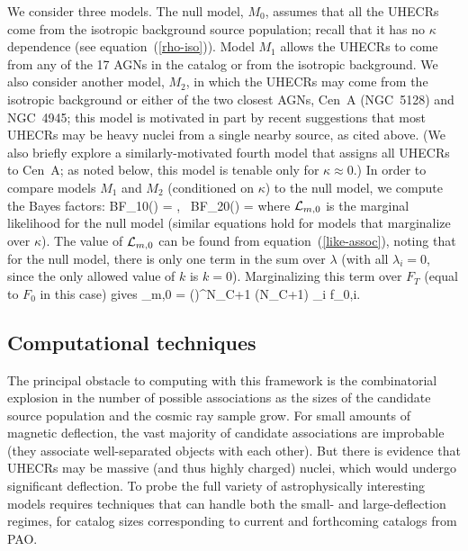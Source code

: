 We consider three models.  The null model, $M_0$, assumes that all the
UHECRs come from the isotropic background source population; recall that it
has no $\kappa$ dependence (see equation~(\ref{rho-iso})).  Model $M_1$
allows the UHECRs to come from any of the 17 AGNs in the catalog or from the
isotropic background.  We also consider another model, $M_2$, in which the
UHECRs may come from the isotropic background or either of the two closest
AGNs, Cen~A (NGC~5128) and NGC~4945; this model is motivated in part by
recent suggestions that most UHECRs may be heavy nuclei from a single nearby
source, as cited above.  
(We also briefly explore a similarly-motivated fourth model that assigns all
UHECRs to Cen~A; as noted below, this model is tenable only for
$\kappa\approx 0$.)  In order to compare models $M_1$ and $M_2$ (conditioned
on $\kappa$) to the null model, we compute the Bayes factors:
\be
\mbox{BF}_{10}(\kappa) = ,
\qquad
\mbox{ BF}_{20}(\kappa) = 
\label{BF10+20}
\ee
where ${\cal L}_{m,0}$ is the marginal likelihood for the null
model (similar equations hold for models
that marginalize over $\kappa$).  The value of ${\cal L}_{m,0}$
can be found from equation~(\ref{like-assoc}), noting that for the
null model, there is only one term in the sum over $\lambda$
(with all $\lambda_i = 0$, since the only allowed value of $k$ is $k=0$).
Marginalizing this term over $F_T$ (equal to $F_0$ in this case) gives
\be
\like_{m,0} =
  \left(\right)^{N_C+1}
  \Gamma(N_C+1) \times \prod_i f_{0,i}.
\ee

\subsection{Computational techniques}
\label{subsec:compn}

The principal obstacle to computing with this framework is the combinatorial
explosion in the number of possible associations as the sizes of the
candidate source population and the cosmic ray sample grow.  For small
amounts of magnetic deflection, the vast majority of candidate associations
are improbable (they associate well-separated objects with each other). But
there is evidence that UHECRs may be massive (and thus highly charged)
nuclei, which would undergo significant deflection. To probe the full
variety of astrophysically interesting models requires techniques that can
handle both the small- and large-deflection regimes, for catalog sizes
corresponding to current and forthcoming catalogs from PAO.

